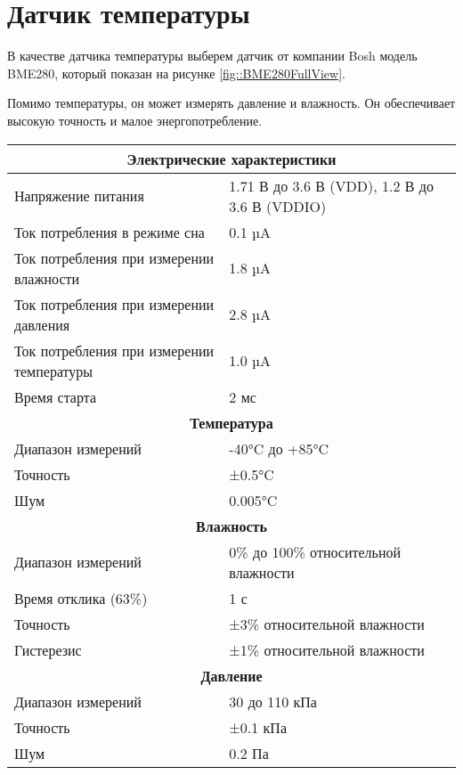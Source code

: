 \section {Датчик температуры}

В качестве датчика температуры выберем датчик от компании Bosh модель BME280, который показан на рисунке 
\ref{fig::BME280FullView}.

Помимо температуры, он может измерять давление и влажность. Он обеспечивает высокую точность и малое энергопотребление. 

\begin{table}[H]
	\centering
	\caption{Характеристики датчика BME280}
	\begin{longtable}{| m{6cm} | m{10cm} |}
		\hline
		\multicolumn{2}{|c|}{\textbf{Электрические характеристики}} \\ \hline
		\endhead
		Напряжение питания & 1.71 В до 3.6 В (VDD), 1.2 В до 3.6 В (VDDIO) \\ \hline
		Ток потребления в режиме сна & 0.1 µA \\ \hline
		Ток потребления при измерении влажности & 1.8 µA \\ \hline
		Ток потребления при измерении давления & 2.8 µA \\ \hline
		Ток потребления при измерении температуры & 1.0 µA \\ \hline
		Время старта & 2 мс \\ \hline
		\multicolumn{2}{|c|}{\textbf{Температура}} \\ \hline
		Диапазон измерений & -40°C до +85°C \\ \hline
		Точность & ±0.5°C \\ \hline
		Шум & 0.005°C \\ \hline
		\multicolumn{2}{|c|}{\textbf{Влажность}} \\ \hline 
		Диапазон измерений & 0\% до 100\% относительной влажности \\ \hline
		Время отклика (63\%) & 1 с \\ \hline
		Точность & ±3\% относительной влажности \\ \hline
		Гистерезис & ±1\% относительной влажности \\ \hline
		
		\multicolumn{2}{|c|}{\textbf{Давление}} \\ \hline 
		Диапазон измерений & 30 до 110 кПа \\ \hline
		Точность & ±0.1 кПа \\ \hline
		Шум & 0.2 Па \\ \hline
		
	\end{longtable}
	\label{tab::TempSensorCharacteristics}
\end{table}

